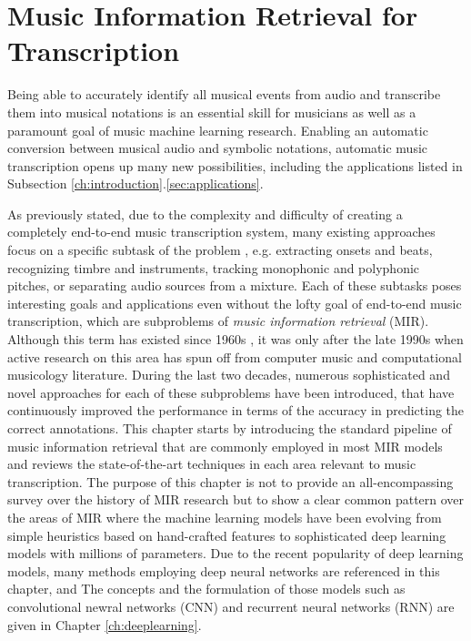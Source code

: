
\graphicspath{{2-mir/figures/}}

\chapter{Music Information Retrieval for Transcription}
\label{ch:mir}

Being able to accurately identify all musical events from audio and transcribe them into musical notations is an essential skill for musicians as well as a paramount goal of music machine learning research.
Enabling an automatic conversion between musical audio and symbolic notations, automatic music transcription opens up many new possibilities, including the applications listed in Subsection \ref{ch:introduction}.\ref{sec:applications}.


As previously stated, due to the complexity and difficulty of creating a completely end-to-end music transcription system, many existing approaches focus on a specific subtask of the problem \cite{casey2008mir}, e.g. extracting onsets and beats, recognizing timbre and instruments, tracking monophonic and polyphonic pitches, or separating audio sources from a mixture.
Each of these subtasks poses interesting goals and applications even without the lofty goal of end-to-end music transcription, which are subproblems of \emph{music information retrieval} (MIR).
Although this term has existed since 1960s \cite{kassler1966mir}, it was only after the late 1990s when active research on this area has spun off from computer music and computational musicology literature.
During the last two decades, numerous sophisticated and novel approaches for each of these subproblems have been introduced, that have continuously improved the performance in terms of the accuracy in predicting the correct annotations.
This chapter starts by introducing the standard pipeline of music information retrieval that are commonly employed in most MIR models and reviews the state-of-the-art techniques in each area relevant to music transcription.
The purpose of this chapter is not to provide an all-encompassing survey over the history of MIR research but to show a clear common pattern over the areas of MIR where the machine learning models have been evolving from simple heuristics based on hand-crafted features to sophisticated deep learning models with millions of parameters.
Due to the recent popularity of deep learning models, many methods employing deep neural networks are referenced in this chapter, and 
The concepts and the formulation of those models such as convolutional newral networks (CNN) and recurrent neural networks (RNN) are given in Chapter \ref{ch:deeplearning}.


